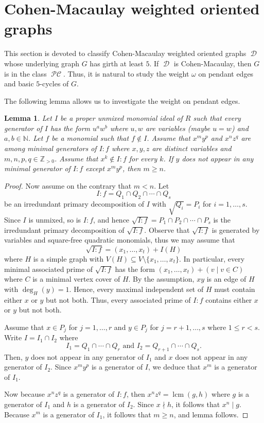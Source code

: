 \documentclass[12pt, amscd]{amsart}
\newtheorem{lem}[thm]{Lemma}
\theoremstyle{definition}
\DeclareMathOperator{\lcm}{lcm}
\DeclareMathOperator{\pc}{\mathcal{PC}}
\DeclareMathOperator{\D}{\mathcal{D}}
\def\Z {\mathbb Z}
\def\N {\mathbb N}
\newcommand{\0}{\bold{0}}
\begin{document}
\section{Cohen-Macaulay weighted oriented graphs}

This section is devoted to classify Cohen-Macaulay weighted oriented graphs $\D$ whose underlying graph $G$ has girth at least $5$.  If $\D$ is Cohen-Macaulay, then $G$ is in the class $\pc$. Thus, it is natural to study the weight $\omega$ on pendant edges and basic $5$-cycles of $G$. 


The following lemma allows us to investigate the weight on pendant edges. 

\begin{lem} \label{CM-L01} Let $I$ be a proper unmixed monomial ideal of $R$ such that every generator of $I$ has the form $u^a w^b$ where $u,w$ are variables (maybe $u=w$) and $a,b\in \N$. Let $f$ be a monomial such that $f\notin I$. Assume that $x^my^p$ and $x^nz^q$ are among  minimal generators of $I \colon f$ where $x,y,z$ are distinct variables and $m,n,p,q \in \Z_{>0}$.  Assume that $x^k \notin I \colon f$ for every $k$.  If $y$ does not appear in any minimal generator of $I\colon f$ except $x^my^p$, then $m\geqslant n$.
\end{lem}
\begin{proof} Now assume on the contrary that $m < n$.  Let
$$I \colon f = Q_1\cap Q_2\cap \cdots\cap Q_s$$
be an irredundant primary decomposition of $I$ with $\sqrt{Q_i} = P_i$ for $i=1,\ldots,s$.  Since $I$ is unmixed, so is $I\colon f$, and hence
$\sqrt{I\colon f} = P_1\cap P_2\cap \cdots\cap P_s$  is the irredundant primary decomposition of $\sqrt{I\colon f}$. Observe that $\sqrt{I\colon f}$ is generated by variables and square-free quadratic monomials, thus we may assume that
$$\sqrt{I\colon f} = (x_1,\ldots,x_t) + I(H)$$
where $H$ is a simple graph with $V(H) \subseteq V \setminus \{x_1,\ldots,x_t\}$.  In particular,  every minimal associated prime of $\sqrt{I\colon f}$ has the form $(x_1,\ldots,x_t) + (v\mid v\in C)$ where $C$ is a minimal vertex cover of $H$.  By the assumption,  $xy$ is an edge of $H$ with $\deg_H(y)=1$. Hence,  every maximal independent set of $H$ must contain either $x$ or $y$ but not both. Thus, every associated prime of $I\colon f$ contains either $x$ or $y$ but not both. 

Assume that $x\in P_j$ for $j=1,\ldots,r$ and $y\in P_j$ for $j = r+1,\ldots,s$ where $1\leqslant r < s$. Write $I = I_1\cap I_2$ where
$$I_1 = Q_1\cap \cdots\cap Q_r \text{ and } I_2 = Q_{r+1}\cap \cdots\cap Q_s.$$
Then, $y$ does not appear in any generator of $I_1$ and $x$ does not appear in any generator of $I_2$. Since $x^my^p$ is a generator of $I$, we deduce that $x^m$ is a generator of $I_1$.

Now because $x^nz^q$ is a generator of $I\colon f$, then $x^nz^q = \lcm(g,h)$ where $g$ is a generator of $I_1$ and $h$ is a generator of $I_2$. Since $x\nmid h$, it follows that $x^n \mid g$. Because $x^m$ is a generator of $I_1$, it follows that $m\geqslant n$, and lemma follows.
\end{proof}
\end{document}

